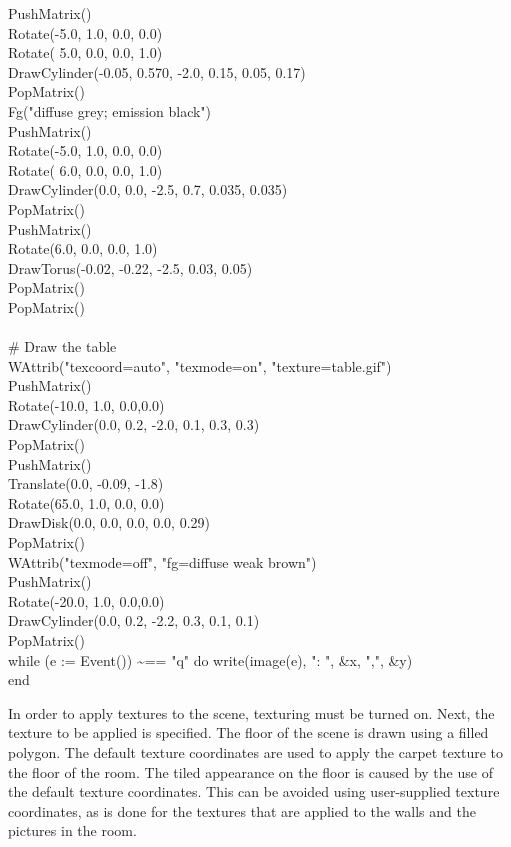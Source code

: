 {\>PushMatrix() \\
\>Rotate(-5.0, 1.0, 0.0, 0.0) \\
\>Rotate( 5.0, 0.0, 0.0, 1.0) \\
\>DrawCylinder(-0.05, 0.570, -2.0, 0.15, 0.05, 0.17) \\
\>PopMatrix() \\
\>Fg("diffuse grey; emission black") \\
\>PushMatrix() \\
\>Rotate(-5.0, 1.0, 0.0, 0.0) \\
\>Rotate( 6.0, 0.0, 0.0, 1.0) \\
\>DrawCylinder(0.0, 0.0, -2.5, 0.7, 0.035, 0.035) \\
\>PopMatrix() \\
\>PushMatrix() \\
\>Rotate(6.0, 0.0, 0.0, 1.0) \\
\>DrawTorus(-0.02, -0.22, -2.5, 0.03, 0.05) \\
\>PopMatrix()  \\
\>PopMatrix() \\
\ \\
\>\# Draw the table  \\
\>WAttrib("texcoord=auto", "texmode=on", "texture=table.gif") \\
\>PushMatrix() \\
\>Rotate(-10.0, 1.0, 0.0,0.0) \\
\>DrawCylinder(0.0, 0.2, -2.0, 0.1, 0.3, 0.3) \\
\>PopMatrix() \\
\>PushMatrix() \\
\>Translate(0.0, -0.09, -1.8) \\
\>Rotate(65.0, 1.0, 0.0, 0.0) \\
\>DrawDisk(0.0, 0.0, 0.0, 0.0, 0.29)  \\
\>PopMatrix() \\
\>WAttrib("texmode=off", "fg=diffuse weak brown") \\
\>PushMatrix() \\
\>Rotate(-20.0, 1.0, 0.0,0.0) \\
\>DrawCylinder(0.0, 0.2, -2.2, 0.3, 0.1, 0.1) \\
\>PopMatrix() \\
\>while (e := Event()) \~{}== "q" do write(image(e), ": ", \&x, ",", \&y) \\
end
}

In order to apply textures to the scene, texturing must be turned
on. Next, the texture to be applied is specified. The floor of the
scene is drawn using a filled polygon. The default texture coordinates
are used to apply the carpet texture to the floor of the room. The
tiled appearance on the floor is caused by the use of the default
texture coordinates. This can be avoided using user-supplied texture
coordinates, as is done for the textures that are applied to the walls
and the pictures in the room.

